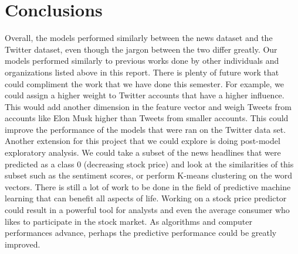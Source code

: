 \documentclass[conference]{IEEEtran}
\begin{document}
\section{Conclusions}
Overall, the models performed similarly between the news dataset and the Twitter dataset, even though the jargon between the two differ greatly. Our models performed similarly to previous works done by other individuals and organizations listed above in this report. 
There is plenty of future work that could compliment the work that we have done this semester. For example, we could assign a higher weight to Twitter accounts that have a higher influence. This would add another dimension in the feature vector and weigh Tweets from accounts like Elon Musk higher than Tweets from smaller accounts. This could improve the performance of the models that were ran on the Twitter data set. Another extension for this project that we could explore is doing post-model exploratory analysis. We could take a subset of the news headlines that were predicted as a class 0 (decreasing stock price) and look at the similarities of this subset such as the sentiment scores, or perform K-means clustering on the word vectors. 
There is still a lot of work to be done in the field of predictive machine learning that can benefit all aspects of life. Working on a stock price predictor could result in a powerful tool for analysts and even the average consumer who likes to participate in the stock market. As algorithms and computer performances advance, perhaps the predictive performance could be greatly improved. 
\end{document}

